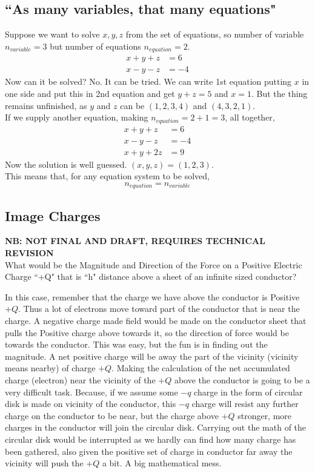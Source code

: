 \documentclass[11pt,a4paper,twocolumn,openright]{article}
\theoremstyle{definition}
\theoremstyle{definition}
\theoremstyle{definition}
\theoremstyle{definition}
\begin{document}
\subsection{``As many variables, that many equations"}\label{appendixeqandvar}
Suppose we want to solve $x,y,z$ from the set of equations, so number of variable $n_{variable} = 3$ but number of equations $n _{equation} = 2$.
\begin{align*}
x + y + z &= 6\\
x - y - z &= -4
\end{align*}
Now can it be solved? No. It can be tried. We can write 1st equation putting $x$ in one side and put this in 2nd equation and get $y +z = 5$ and $x=1$. But the thing remains unfinished, as $y$ and $z$ can be $(1,2,3,4)$ and $(4,3,2,1)$. \\ 
If we supply another equation, making $n _{equation} = 2+1=3$,
all together,
\begin{align*}
x + y + z &= 6 \\
x - y - z &= -4 \\
x + y + 2z &= 9  
\end{align*}
Now the solution is well guessed. $(x,y,z) = (1,2,3)$.
\\

This means that, for any equation system to be solved,
\begin{equation}
n _{equation} = n_{variable} 
\end{equation}
\subsection{Image Charges} \label{imagechargeappendix}
{\footnotesize \textbf{NB: NOT FINAL AND DRAFT, REQUIRES TECHNICAL REVISION}}\\
What would be the Magnitude and Direction of the Force on a Positive Electric Charge ``+Q" that is ``h" distance above a sheet of an infinite sized conductor? 

	
In this case, remember that the charge we have above the conductor is Positive 
$+Q$. Thus a lot of electrons move toward part of the conductor that is near the charge. A negative charge made field would be made on the conductor sheet that pulls the Positive charge above towards it, so the direction of force would be towards the conductor. This was easy, but the fun is in finding out the magnitude. A net positive charge will be away the part of the vicinity (vicinity means nearby) of charge $+Q$. Making the calculation of the net accumulated charge (electron) near the vicinity of the $+Q$ above the conductor is going to be a very difficult task. Because, if we assume some $-q$ charge in the form of circular disk is made on vicinity of the conductor, this $-q$ charge will resist any further charge on the conductor to be near, but the charge above $+Q$ stronger, more charges in the conductor will join the circular disk. Carrying out the math of the circular disk would be interrupted as we hardly can find how many charge has been gathered, also given the positive set of charge in conductor far away the vicinity will push the $+Q$ a bit. A big mathematical mess.
\end{document}
